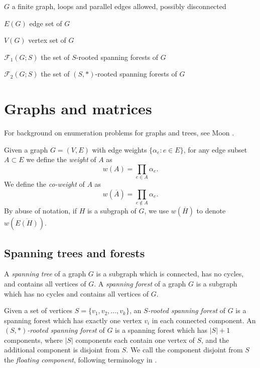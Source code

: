 \documentclass{amsart}
\theoremstyle{definition}
\newcommand{\RR}{\mathbb{R}}
\newcommand{\trees}{\mathcal{F}_1}
\newcommand{\forests}{\mathcal{F}}
\newcommand{\coweight}[1]{w(\overline{#1})}
\begin{document}

$G$ a finite graph, 
loops and parallel edges allowed,
possibly disconnected

$E(G)$ edge set of $G$

$V(G)$ vertex set of $G$




%

$\trees(G;S)$ the set of $S$-rooted spanning forests of $G$

$\forests_2(G;S)$ the set of $(S,*)$-rooted spanning forests of $G$


\section{Graphs and matrices}
\label{sec:graphs-matrices}

For background on enumeration problems for graphs and trees, see Moon \cite{moon}.

Given a graph $G = (V, E)$ with edge weights $\{ \alpha_e : e \in E\}$, for any edge subset $A \subset E$ we define the {\em weight} of $A$ as
\[
	w(A) = \prod_{e \in A} \alpha_e.
\]
We define the {\em co-weight} of $A$ as
\[
	w(\overline A) = \prod_{e \not\in A} \alpha_e.
\]
By abuse of notation, if $H$ is a subgraph of $G$, we use $\coweight{H}$ to denote $\coweight{E(H)}$.

\subsection{Spanning trees and forests}
A {\em spanning tree} of a graph $G$ is a subgraph which 
is connected, has no cycles,
and contains all vertices of $G$.
A {\em spanning forest} of a graph $G$ is a subgraph which 
has no cycles
and 
contains all vertices of $G$. 

Given a set of vertices $S = \{v_1, v_2, \ldots, v_k\}$,
an {\em $S$-rooted spanning forest} of $G$ 
is a spanning forest which has exactly one vertex $v_i$ in each connected component.
An {\em $(S,*)$-rooted spanning forest} of $G$ is a spanning forest which has $|S|+1$ components, where $|S|$ components each contain one vertex of $S$, and the additional component is disjoint from $S$.
We call the component disjoint from $S$ the {\em floating component}, following terminology in \cite{kassel-kenyon-wu}.
\end{document}
